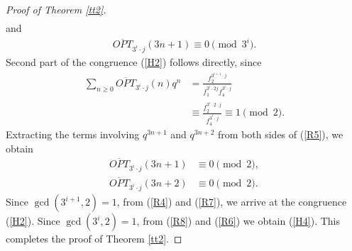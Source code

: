 \documentclass[12pt,reqno,a4paper]{amsart}
\numberwithin{equation}{section}
\begin{document}
\begin{proof}[Proof of Theorem \ref{tt2}]
\begin{align}
    \end{align}
    and 
    \begin{align}
     \label{R8}   \overline{OPT}_{3^i\cdot j}(3n+1)\equiv 0\pmod{3^{i}}.
    \end{align}
Second part of the congruence (\ref{H2}) follows directly, since
     \begin{align}
        \sum_{n\geq 0}\overline{OPT}_{3^i\cdot j}(n)q^n&= \frac{f_2^{3^{i+1}\cdot j}}{f_1^{3^i\cdot 2j}f_4^{3^i\cdot j}}\nonumber\\
        & \equiv \frac{f_2^{3^i\cdot 2\cdot j}}{f_4^{3^i\cdot j}} \equiv 1\pmod{2}.\label{R5}
    \end{align}
    Extracting the terms involving $q^{3n+1}$ and $q^{3n+2}$ from both sides of (\ref{R5}), we obtain
    \begin{align}
       \label{R6} \overline{OPT}_{3^i\cdot j}(3n+1)&\equiv 0\pmod{2},\\
       \label{R7} \overline{OPT}_{3^i\cdot j}(3n+2)&\equiv 0\pmod{2}.
    \end{align}
    Since $\gcd(3^{i+1},2)=1$, from (\ref{R4}) and (\ref{R7}), we arrive at the congruence (\ref{H2}). Since $\gcd(3^{i},2)=1$, from (\ref{R8}) and (\ref{R6}) we obtain (\ref{H4}). This completes the proof of Theorem \ref{tt2}.
 \end{proof}
 
 
\end{document}
